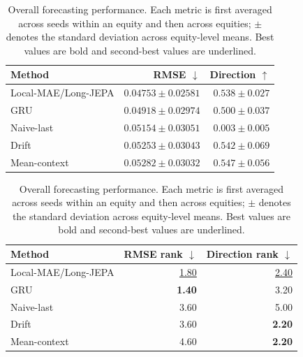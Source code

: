 \begin{table}[t]
\centering
\small
\caption{Overall forecasting performance. Each metric is first averaged across seeds within an equity and then across equities; $\pm$ denotes the standard deviation across equity-level means. Best values are bold and second-best values are underlined.}
\label{tab:main_metrics}
\begin{tabular}{lrr}
\toprule
Method & RMSE $\downarrow$ & Direction $\uparrow$ \\
\midrule
Local-MAE/Long-JEPA & \textbf{$0.04753 \pm 0.02581$} & $0.538 \pm 0.027$ \\
GRU & \underline{$0.04918 \pm 0.02974$} & $0.500 \pm 0.037$ \\
Naive-last & $0.05154 \pm 0.03051$ & $0.003 \pm 0.005$ \\
Drift & $0.05253 \pm 0.03043$ & \underline{$0.542 \pm 0.069$} \\
Mean-context & $0.05282 \pm 0.03032$ & \textbf{$0.547 \pm 0.056$} \\
\bottomrule
\end{tabular}
\par\medskip
\begin{tabular}{lrr}
\toprule
Method & RMSE rank $\downarrow$ & Direction rank $\downarrow$ \\
\midrule
Local-MAE/Long-JEPA & \underline{1.80} & \underline{2.40} \\
GRU & \textbf{1.40} & 3.20 \\
Naive-last & 3.60 & 5.00 \\
Drift & 3.60 & \textbf{2.20} \\
Mean-context & 4.60 & \textbf{2.20} \\
\bottomrule
\end{tabular}
\end{table}

